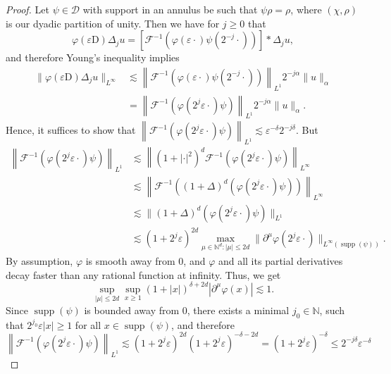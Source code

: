 \documentclass[a4paper,11pt]{article}
\newcommand{\cdummy}{\cdot}
\newcommand{\mathD}{\mathrm{D}}
\newcommand{\tmop}[1]{\ensuremath{\operatorname{#1}}}
\theoremstyle{remark}
\newcommand{\CD}{\ensuremath{\mathscr{D}}}
\newcommand{\CF}{\ensuremath{\mathscr{F}}}
\begin{document}
\begin{proof}
  Let $\psi \in \CD$ with support in an annulus be such that $\psi \rho = \rho$, where $( \chi , \rho )$ is our dyadic partition of unity. Then we have for $j \geqslant 0$ that
  \[
     \varphi ( \varepsilon \mathD ) \Delta_{j} u= \left[ \CF^{-1} ( \varphi (\varepsilon \cdummy ) \psi ( 2^{-j} \cdummy ) ) \right] \ast \Delta_{j}  u,
  \]
  and therefore Young's inequality implies
  \begin{align*}
     \| \varphi ( \varepsilon \mathD ) \Delta_{j} u \|_{L^{\infty}} & \lesssim \left\| \CF^{-1} ( \varphi ( \varepsilon \cdummy ) \psi ( 2^{-j} \cdummy ) ) \right\|_{L^{1}} 2^{-j \alpha} \| u \|_{\alpha} \\
     & = \left\| \CF^{-1} ( \varphi ( 2^{j} \varepsilon \cdummy ) \psi ) \right\|_{L^{1}} 2^{-j \alpha} \| u \|_{\alpha}.
  \end{align*}
  Hence, it suffices to show that $\left\| \CF^{-1} ( \varphi ( 2^{j} \varepsilon \cdummy ) \psi ) \right\|_{L^{1}} \lesssim \varepsilon^{- \delta} 2^{-j \delta}$. But
  \begin{align*}
     \left\| \CF^{-1} ( \varphi ( 2^{j} \varepsilon \cdummy ) \psi ) \right\|_{L^{1}} & \lesssim \left\| ( 1+ | \cdot |^{2} )^{d} \CF^{-1} ( \varphi ( 2^{j} \varepsilon \cdummy ) \psi ) \right\|_{L^{\infty}}  \\
     & \lesssim \left\| \CF^{-1} ( ( 1+ \Delta )^{d} ( \varphi ( 2^{j} \varepsilon \cdummy ) \psi ) ) \right\|_{L^{\infty}} \\
     & \lesssim \| ( 1+ \Delta )^{d} ( \varphi ( 2^{j} \varepsilon \cdummy ) \psi ) \|_{L^{1}} \\
     & \lesssim ( 1+2^{j} \varepsilon )^{2d} \max_{\mu \in \mathbb{N}^{d} : | \mu | \leqslant 2d} \| \partial^{\mu} \varphi ( 2^{j}  \varepsilon \cdot ) \|_{L^{\infty} ( \tmop{supp} ( \psi ) )} .
  \end{align*}
  By assumption, $\varphi$ is smooth away from 0, and $\varphi$ and all its partial derivatives decay faster than any rational function at infinity. Thus, we get
  \[
     \sup_{|\mu| \leqslant 2d} \sup_{x \geqslant 1} ( 1+ | x | )^{\delta +2d} | \partial^{\mu} \varphi ( x ) | \lesssim 1.
  \]
  Since $\tmop{supp} ( \psi )$ is bounded away from $0$, there exists a minimal $j_{0} \in \mathbb{N}$, such that $2^{j_{0}} \varepsilon | x | \geqslant 1$ for all $x \in \tmop{supp} ( \psi )$, and therefore
  \[
     \left\| \CF^{-1} ( \varphi ( 2^{j} \varepsilon \cdummy ) \psi ) \right\|_{L^{1}} \lesssim ( 1+2^{j} \varepsilon )^{2d} ( 1+2^{j}\varepsilon )^{- \delta -2d} = ( 1+2^{j} \varepsilon )^{- \delta} \leqslant 2^{-j \delta} \varepsilon^{- \delta}
\]
\end{proof}
\end{document}
